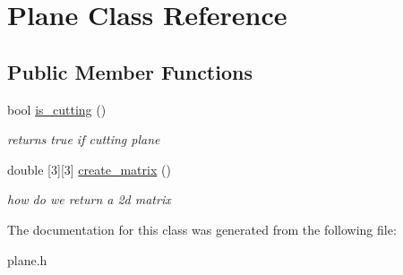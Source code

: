 \hypertarget{class_plane}{}\section{Plane Class Reference}
\label{class_plane}
\subsection*{Public Member Functions}
\begin{DoxyCompactItemize}
\item 
\mbox{\label{class_plane_a973133b5a74cd37461ce6b46c1254664}} 
bool \mbox{\hyperlink{class_plane_a973133b5a74cd37461ce6b46c1254664}{is\+\_\+cutting}} ()
\begin{DoxyCompactList}\small\item\em returns true if cutting plane \end{DoxyCompactList}\item 
\mbox{\label{class_plane_afb6253bcd033c87d25ca05e2a0174ac0}} 
double \mbox{[}3\mbox{]}\mbox{[}3\mbox{]} \mbox{\hyperlink{class_plane_afb6253bcd033c87d25ca05e2a0174ac0}{create\+\_\+matrix}} ()
\begin{DoxyCompactList}\small\item\em how do we return a 2d matrix \end{DoxyCompactList}\end{DoxyCompactItemize}


The documentation for this class was generated from the following file\+:\begin{DoxyCompactItemize}
\item 
plane.\+h\end{DoxyCompactItemize}
